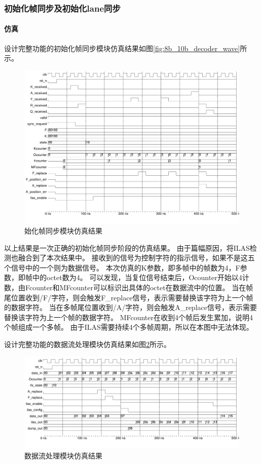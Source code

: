 \documentclass[UTF8]{ctexart}
\begin{document}
\subsubsection{初始化帧同步及初始化lane同步}

\paragraph{仿真}

设计完整功能的初始化帧同步模块仿真结果如图\ref{fig:8b_10b_decoder_wave}所示。

\begin{figure}[H]
	\centering
	\includegraphics[width=18cm]{./img/ifs_detection_wave.pdf}
	\caption{始化帧同步模块仿真结果}
	\label{fig:ifs_detection_wave}
\end{figure}

以上结果是一次正确的初始化帧同步阶段的仿真结果。
由于篇幅原因，将ILAS检测也融合到了本次结果中。
接收到的信号为控制字符的指示信号，如果不是这五个信号中的一个则为数据信号。
本次仿真的K参数，即多帧中的帧数为4，F参数，即帧中的octet数为4。
可以发现，当复位信号结束后，Ocounter开始以4计数，由Fcounter和MFcounter可以标识出具体的octet在数据流中的位置。
当在帧尾位置收到/F/字符，则会触发F\_replace信号，表示需要替换该字符为上一个帧的数据字符。
当在多帧尾位置收到/A/字符，则会触发A\_replace信号，表示需要替换该字符为上一个帧的数据字符。
MFcounter在收到4个帧后发生累加，说明4个帧组成一个多帧。
由于ILAS需要持续4个多帧周期，所以在本图中无法体现。

设计完整功能的数据流处理模块仿真结果如图\ref{fig:data_flow_wave}所示。

\begin{figure}[H]
	\centering
	\includegraphics[width=18cm]{./img/data_flow_wave.pdf}
	\caption{数据流处理模块仿真结果}
	\label{fig:data_flow_wave}
\end{figure}
\end{document}
